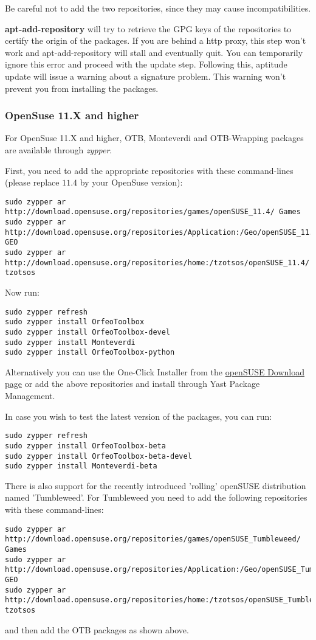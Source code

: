 Be careful not to add the two repositories, since they may cause incompatibilities.

\textbf{apt-add-repository} will try to retrieve the GPG keys of the
repositories to certify the origin of the packages. If you are behind a http
proxy, this step won't work and apt-add-repository will stall and eventually
quit. You can temporarily ignore this error and proceed with the update
step. Following this, aptitude update will issue a warning about a signature
problem. This warning won't prevent you from installing the packages.

\subsubsection{OpenSuse 11.X and higher}
\label{ssec:opensuse_binaries}

For OpenSuse 11.X and higher, OTB, Monteverdi and
OTB-Wrapping packages are available through \emph{zypper}.

First, you need to add the appropriate repositories with these command-lines (please replace $11.4$ by your OpenSuse version):
\begin{verbatim}
sudo zypper ar
http://download.opensuse.org/repositories/games/openSUSE_11.4/ Games
sudo zypper ar
http://download.opensuse.org/repositories/Application:/Geo/openSUSE_11.4/ GEO
sudo zypper ar
http://download.opensuse.org/repositories/home:/tzotsos/openSUSE_11.4/ tzotsos
\end{verbatim}

Now run:
\begin{verbatim}
sudo zypper refresh
sudo zypper install OrfeoToolbox
sudo zypper install OrfeoToolbox-devel
sudo zypper install Monteverdi
sudo zypper install OrfeoToolbox-python
\end{verbatim}

Alternatively you can use the One-Click Installer from the \href{http://software.opensuse.org/search?q=Orfeo&baseproject=openSUSE\%3A11.4&lang=en&include_home=true&exclude_debug=true}{openSUSE Download page} or add the above repositories and install through Yast Package Management.

In case you wish to test the latest version of the packages, you can run:
\begin{verbatim}
sudo zypper refresh
sudo zypper install OrfeoToolbox-beta
sudo zypper install OrfeoToolbox-beta-devel
sudo zypper install Monteverdi-beta
\end{verbatim}

There is also support for the recently introduced 'rolling' openSUSE distribution named 'Tumbleweed'.
For Tumbleweed you need to add the following repositories with these command-lines:
\begin{verbatim}
sudo zypper ar
http://download.opensuse.org/repositories/games/openSUSE_Tumbleweed/ Games
sudo zypper ar
http://download.opensuse.org/repositories/Application:/Geo/openSUSE_Tumbleweed/ GEO
sudo zypper ar
http://download.opensuse.org/repositories/home:/tzotsos/openSUSE_Tumbleweed/ tzotsos
\end{verbatim}
and then add the OTB packages as shown above.

